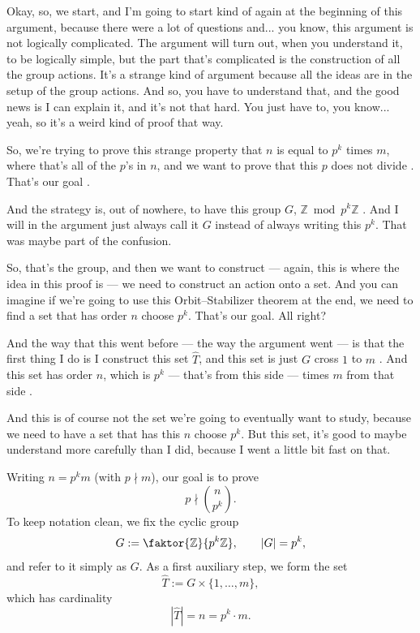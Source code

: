 \begin{proofWrapper}
\begin{speech}[00:45:02 - 00:47:01]
Okay, so, we start, and I'm going to start kind of again at the beginning of this argument, because there were a lot of questions and... you know, this argument is not logically complicated. The argument will turn out, when you understand it, to be logically simple, but the part that's complicated is the construction of all the group actions. It's a strange kind of argument because all the ideas are in the setup of the group actions. And so, you have to understand that, and the good news is I can explain it, and it's not that hard. You just have to, you know... yeah, so it's a weird kind of proof that way.

So, we're trying to prove this strange property that $n$ is equal to $p^k$ times $m$, where that's all of the $p$'s in $n$, and we want to prove that this $p$ does not divide . That's our goal .

And the strategy is, out of nowhere, to have this group $G$, $\mathbb{Z} \bmod p^k \mathbb{Z}$ . And I will in the argument just always call it $G$ instead of always writing this $p^k$. That was maybe part of the confusion.

So, that's the group, and then we want to construct --- again, this is where the idea in this proof is --- we need to construct an action onto a set. And you can imagine if we're going to use this Orbit--Stabilizer theorem at the end, we need to find a set that has order $n$ choose $p^k$. That's our goal. All right?

And the way that this went before --- the way the argument went --- is that the first thing I do is I construct this set $\widehat{T}$, and this set is just $G$ cross $1$ to $m$ . And this set has order $n$, which is $p^k$ --- that's from this side --- times $m$ from that side .

And this is of course not the set we're going to eventually want to study, because we need to have a set that has this $n$ choose $p^k$. But this set, it's good to maybe understand more carefully than I did, because I went a little bit fast on that.
\end{speech}

\begin{content}
Writing $n = p^k m$ (with $p \nmid m$), our goal is to prove
\[
p \nmid \binom{n}{p^k}.
\]
To keep notation clean, we fix the cyclic group
\[
G := \faktor{\mathbb{Z}}{p^k\mathbb{Z}}, \qquad |G| = p^k,
\]
and refer to it simply as $G$. As a first auxiliary step, we form the set
\[
\widehat{T} := G \times \{1, \dots, m\},
\]
which has cardinality
\[
|\widehat{T}| = n = p^k \cdot m.
\]
\end{content}


\end{proofWrapper}
